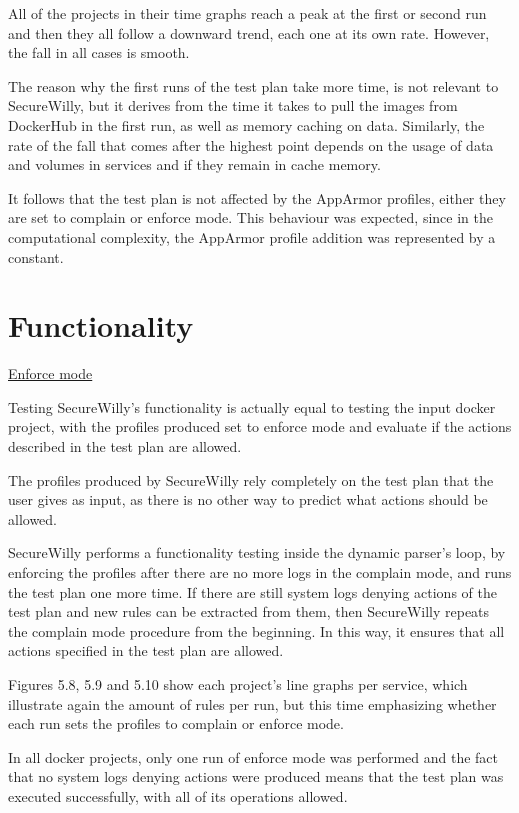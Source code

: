 All of the projects in their time graphs reach a peak at the first or second run and then they all follow a downward trend, each one at its own rate. However, the fall in all cases is smooth.

The reason why the first runs of the test plan take more time, is not relevant to SecureWilly, but it derives from the time it takes to pull the images from DockerHub in the first run, as well as memory caching on data. Similarly, the rate of the fall that comes after the highest point depends on the usage of data and volumes in services and if they remain in cache memory.

It follows that the test plan is not affected by the AppArmor profiles, either they are set to complain or enforce mode. This behaviour was expected, since in the computational complexity, the AppArmor profile addition was represented by a constant.

\section{Functionality}
\underline{Enforce mode}
\hfill\break

Testing SecureWilly's functionality is actually equal to testing the input docker project, with the profiles produced set to enforce mode and evaluate if the actions described in the test plan are allowed.

The profiles produced by SecureWilly rely completely on the test plan that the user gives as input, as there is no other way to predict what actions should be allowed.  

SecureWilly performs a functionality testing inside the dynamic parser's loop, by enforcing the profiles after there are no more logs in the complain mode, and runs the test plan one more time. If there are still system logs denying actions of the test plan and new rules can be extracted from them, then SecureWilly repeats the complain mode procedure from the beginning. In this way, it ensures that all actions specified in the test plan are allowed.

Figures 5.8, 5.9 and 5.10 show each project's line graphs per service, which illustrate again the amount of rules per run, but this time emphasizing whether each run sets the profiles to complain or enforce mode.

In all docker projects, only one run of enforce mode was performed and the fact that no system logs denying actions were produced means that the test plan was executed successfully, with all of its operations allowed.

